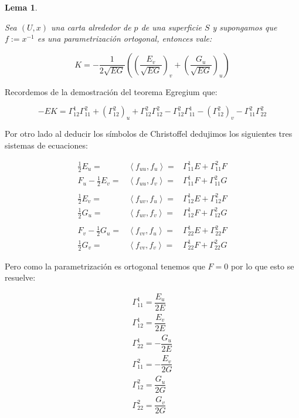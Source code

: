\documentclass[11pt]{article}
\newcommand\ip[1]{\left\langle#1\right\rangle}
\newtheorem{lemma}[theorem]{Lema}
\newenvironment{proof}[1][Demostraci\'on]{\begin{trivlist}
		\item[\hskip \labelsep {\bfseries #1}]}{\end{trivlist}}
\begin{document}
\begin{lemma}
	\label{Curvatura Gaussiana en funcion del primer tensor}
		
	Sea $(U,x)$ una carta alrededor de $p$ de una superficie $S$ y supongamos que $f := x^{-1}$ es una parametrizaci\'on ortogonal, entonces vale:
	
	\[
	K = -\dfrac{1}{2\sqrt{EG}} \left(\left(\dfrac{E_v}{\sqrt{EG}}\right)_v + \left(\dfrac{G_u}{\sqrt{EG}}\right)_u \right)
	\]
	
\end{lemma}	

\begin{proof}
	Recordemos de la demostraci\'on del teorema Egregium que:
	
	\[
	-EK = \Gamma^{1}_{12}\Gamma^{2}_{11} + \left(\Gamma^{2}_{12}\right)_u + \Gamma^{2}_{12} \Gamma^{2}_{12} - \Gamma^{2}_{12}\Gamma^{1}_{11} - \left(\Gamma^{2}_{12}\right)_v - \Gamma^{2}_{11}  \Gamma^{2}_{22}
	\]
	
	Por otro lado al deducir los s\'imbolos de Christoffel dedujimos los siguientes tres sistemas de ecuaciones:
	
	\begin{equation*}
	\begin{aligned}
		\frac{1}{2} E_u = & \ip{f_{uu}, f_u} = & \Gamma^{1}_{11} E + \Gamma^{2}_{11}F \\
		F_u - \frac{1}{2} E_v = & \ip{f_{uu}, f_v} = & \Gamma^{1}_{11} F + \Gamma^{2}_{11}G \\
		\\
		\frac{1}{2} E_v = & \ip{f_{uv}, f_u} = & \Gamma^{1}_{12} E + \Gamma^{2}_{12}F \\
		\frac{1}{2} G_u = & \ip{f_{uv}, f_v} = & \Gamma^{1}_{12} F + \Gamma^{2}_{12}G \\
		\\
		F_v - \frac{1}{2} G_u = & \ip{f_{vv}, f_u} = & \Gamma^{1}_{22} E + \Gamma^{2}_{22}F \\
		\frac{1}{2} G_v = & \ip{f_{vv}, f_v} = & \Gamma^{1}_{22} F + \Gamma^{2}_{22}G 		
	\end{aligned}
	\end{equation*}
	
	Pero como la parametrizaci\'on es ortogonal tenemos que $F = 0$ por lo que esto se resuelve:
	
	\begin{equation*}
	\begin{aligned}
	\Gamma^{1}_{11} = \dfrac{E_u}{2E}\\
	\Gamma^{1}_{12} = \dfrac{E_v}{2E}\\
	\Gamma^{1}_{22} = - \dfrac{G_u}{2E}\\
	\Gamma^{2}_{11} = - \dfrac{E_v}{2G} \\
	\Gamma^{2}_{12} = \dfrac{G_u}{2G}\\
	\Gamma^{2}_{22} = \dfrac{G_v}{2G}
	\end{aligned}
	\end{equation*}
	

\end{proof}
\end{document}
